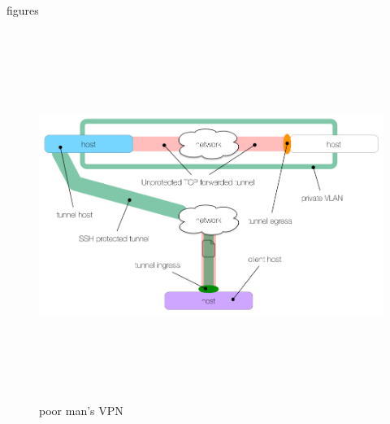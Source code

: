 figures
\begin{figure}[h!]
  \centering
  \includegraphics[width=15cm,height=12cm,keepaspectratio]{../media/crawler/ssh-tunnel-host-access.png}
  \caption{poor man's VPN}
  \label{fig:poormanvpn}
\end{figure}